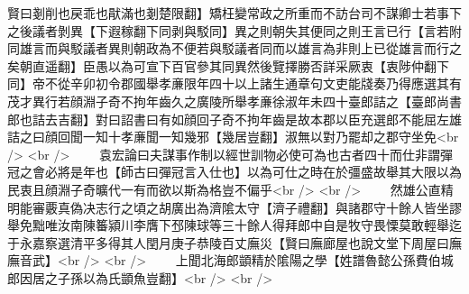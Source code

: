 賢曰剗削也戻乖也猒滿也剗楚限翻】矯枉變常政之所重而不訪台司不謀卿士若事下之後議者剝異【下遐稼翻下同剥與駁同】異之則朝失其便同之則王言已行【言若附同雄言而與駁議者異則朝政為不便若與駁議者同而以雄言為非則上已從雄言而行之矣朝直遥翻】臣愚以為可宣下百官參其同異然後覽擇勝否詳采厥衷【衷陟仲翻下同】帝不從辛卯初令郡國舉孝亷限年四十以上諸生通章句文吏能牋奏乃得應選其有茂才異行若顔淵子奇不拘年齒久之廣陵所舉孝亷徐淑年未四十臺郎詰之【臺郎尚書郎也詰去吉翻】對曰詔書曰有如顔回子奇不拘年齒是故本郡以臣充選郎不能屈左雄詰之曰顔回聞一知十孝亷聞一知幾邪【幾居豈翻】淑無以對乃罷却之郡守坐免<br />
<br />
　　袁宏論曰夫謀事作制以經世訓物必使可為也古者四十而仕非謂彈冠之會必將是年也【師古曰彈冠言入仕也】以為可仕之時在於彊盛故舉其大限以為民衷且顔淵子奇曠代一有而欲以斯為格豈不偏乎<br />
<br />
　　然雄公直精明能審覈真偽决志行之頃之胡廣出為濟隂太守【濟子禮翻】與諸郡守十餘人皆坐謬舉免黜唯汝南陳䉒潁川李膺下邳陳球等三十餘人得拜郎中自是牧守畏慄莫敢輕舉迄于永嘉察選清平多得其人閏月庚子恭陵百丈廡災【賢曰廡廊屋也說文堂下周屋曰廡廡音武】<br />
<br />
　　上聞北海郎顗精於隂陽之學【姓譜魯懿公孫費伯城郎因居之子孫以為氏顗魚豈翻】<br />
<br />
